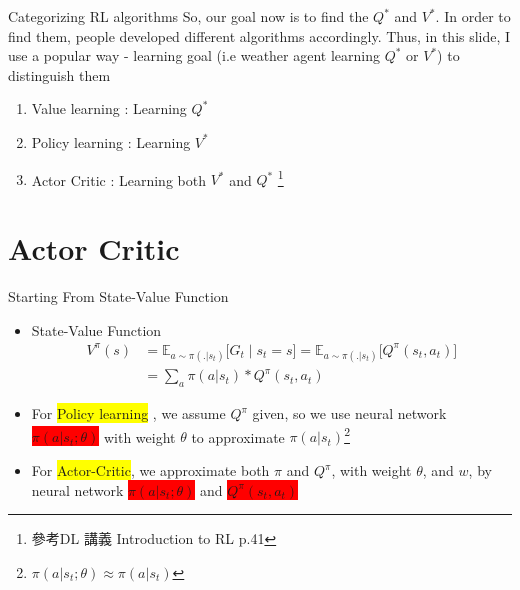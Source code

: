 \documentclass{beamer}
\begin{document}
    \begin{frame}{Categorizing RL algorithms}
        So, our goal now is to find the $Q^*$ and $V^*$. In order to find them, people developed different algorithms accordingly. Thus, in this slide, I use a popular way - learning goal (i.e weather agent learning $Q^*$ or $V^*$)
        to distinguish them 
        \begin{enumerate}
            \item Value learning : Learning $Q^*$
            \item Policy learning : Learning $V^*$
            \item Actor Critic : Learning both $V^*$ and $Q^*$ \footnote{參考DL 講義 Introduction to RL p.41}
        \end{enumerate}
    \end{frame}
    

\section{Actor Critic}

    \begin{frame}{Starting From State-Value Function}
        \begin{itemize}
            \item State-Value Function 
            \begin{align*}
            V^{\pi}(s) 
              &= \mathbb{E}_{a\sim\pi(.|s_t)}\bigl[G_t \mid s_t = s\bigr] = \mathbb{E}_{a\sim\pi(.|s_t)}\bigl[Q^{\pi}(s_t, a_t)\bigr] \\
              &= \sum_{a}\pi(a|s_t)*Q^{\pi}(s_t, a_t)
            \end{align*}
            \item For \colorbox{yellow}{Policy learning} , we assume $Q^{\pi}$ given, so we use neural network \colorbox{red}{$\pi(a|s_t; \theta)$} with weight $\theta$ to approximate $\pi(a|s_t)$\footnote{$\pi(a|s_t; \theta)\approx \pi(a|s_t)$} 

            \item For \colorbox{yellow}{Actor-Critic}, we approximate both $\pi$ and $Q^{\pi}$, with weight $\theta$, and $w$, by neural network \colorbox{red}{$\pi(a|s_t; \theta)$} and \colorbox{red}{$Q^{\pi}(s_t, a_t)$} 
        \end{itemize}
    \end{frame}
    
\end{document}
